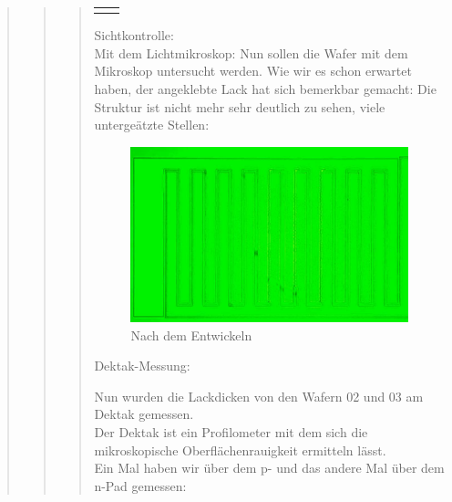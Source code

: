 \begin{quote}
\begin{quote}
\begin{quote}
\begin{center}
\begin{tabular}{ll}
\begin{minipage}{0.6\textwidth}
                    \end{minipage}

                \end{tabular}
			\end{center}
    
    		\vspace{2em}
    		
    		Sichtkontrolle:\\

			Mit dem Lichtmikroskop: Nun sollen die Wafer mit dem Mikroskop 
			untersucht werden. Wie wir es schon erwartet haben, der angeklebte 
			Lack hat sich bemerkbar gemacht: Die Struktur ist nicht mehr sehr 
			deutlich zu sehen, viele untergeätzte Stellen:
			
            \vspace{2em}

    		\begin{figure}[H]
				\hspace{3 cm}
                  \includegraphics[scale=0.9, trim = 0cm 0cm 0cm 0cm,clip]
                	{./HerstellungBilder/Mikroskopbild3.png}
                  \caption{Nach dem Entwickeln}
                \label{fig:nachentwickelnwaf}
            \end{figure}

    		\vspace{2em}
    		
    		Dektak-Messung:

			Nun wurden die Lackdicken von den Wafern 02 und 03 am Dektak 
			gemessen.\\
			Der Dektak ist ein Profilometer mit dem sich die mikroskopische 
			Oberflächenrauigkeit ermitteln lässt.\\ 
			Ein Mal haben wir über dem p- und das andere Mal über dem n-Pad 
			gemessen:\\


\end{quote}
\end{quote}
\end{quote}

